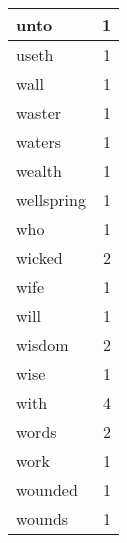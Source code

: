 \begin{center}
\begin{longtable}{l|r}
unto & 1\\ \hline 
useth & 1\\ \hline 
wall & 1\\ \hline 
waster & 1\\ \hline 
waters & 1\\ \hline 
wealth & 1\\ \hline 
wellspring & 1\\ \hline 
who & 1\\ \hline 
wicked & 2\\ \hline 
wife & 1\\ \hline 
will & 1\\ \hline 
wisdom & 2\\ \hline 
wise & 1\\ \hline 
with & 4\\ \hline 
words & 2\\ \hline 
work & 1\\ \hline 
wounded & 1\\ \hline 
wounds & 1\\ \hline 
\end{longtable}  
\end{center}  


  
\normalsize  

  
  
